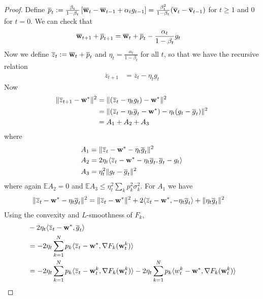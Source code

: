\begin{proof}
	Define $\overline{p}_{t}:=\frac{\beta_{t}}{1-\beta_{t}}\left[{\overline{\mathbf{w}}}_{t}-{\overline{\mathbf{w}}}_{t-1}+\alpha_{t}g_{t-1}\right]=\frac{\beta_{t}^{2}}{1-\beta_{t}}({\overline{\mathbf{v}}}_{t}-{\overline{\mathbf{v}}}_{t-1})$
	for $t\geq1$ and 0 for $t=0$. We can check that 
	\begin{align*}
	{\overline{\mathbf{w}}}_{t+1}+\overline{p}_{t+1} & ={\overline{\mathbf{w}}}_{t}+\overline{p}_{t}-\frac{\alpha_{t}}{1-\beta_{t}}g_{t}
	\end{align*}
	Now we define $\overline{z}_{t}:={\overline{\mathbf{w}}}_{t}+\overline{p}_{t}$
	and $\eta_{t}=\frac{\alpha_{t}}{1-\beta_{t}}$ for all $t$, so that
	we have the recursive relation 
	\begin{align*}
	\overline{z}_{t+1} & =\overline{z}_{t}-\eta_{t}g_{t}
	\end{align*}
	Now 
	\begin{align*}
	\|\overline{z}_{t+1}-{\mathbf{w}}^{\ast}\|^{2} & =\|(\overline{z}_{t}-\eta_{t}g_{t})-{\mathbf{w}}^{\ast}\|^{2}\\
	& =\|(\overline{z}_{t}-\eta_{t}\overline{g}_{t}-{\mathbf{w}}^{\ast})-\eta_{t}(g_{t}-\overline{g}_{t})\|^{2}\\
	& =A_{1}+A_{2}+A_{3}
	\end{align*}
	where 
	\begin{align*}
	A_{1} & =\|\overline{z}_{t}-{\mathbf{w}}^{\ast}-\eta_{t}\overline{g}_{t}\|^{2}\\
	A_{2} & =2\eta_{t}\langle\overline{z}_{t}-{\mathbf{w}}^{\ast}-\eta_{t}\overline{g}_{t},\overline{g}_{t}-g_{t}\rangle\\
	A_{3} & =\eta_{t}^{2}\|g_{t}-\overline{g}_{t}\|^{2}
	\end{align*}
	where again $\mathbb{E}A_{2}=0$ and $\mathbb{E}A_{3}\leq\eta_{t}^{2}\sum_{k}p_{k}^{2}\sigma_{k}^{2}$.
	For $A_{1}$ we have 
	\begin{align*}
	\|\overline{z}_{t}-{\mathbf{w}}^{\ast}-\eta_{t}\overline{g}_{t}\|^{2} & =\|\overline{z}_{t}-{\mathbf{w}}^{\ast}\|^{2}+2\langle\overline{z}_{t}-{\mathbf{w}}^{\ast},-\eta_{t}\overline{g}_{t}\rangle+\|\eta_{t}\overline{g}_{t}\|^{2}
	\end{align*}
	Using the convexity and $L$-smoothness of $F_{k}$, 
	\begin{align*}
	& -2\eta_{t}\langle\overline{z}_{t}-\vw^{\ast},\overline{g}_{t}\rangle\\
	& =-2\eta_{t}\sum_{k=1}^{N}p_{k}\langle\overline{z}_{t}-\vw^{\ast},\nabla F_{k}(\vw_{t}^{k})\rangle\\
	& =-2\eta_{t}\sum_{k=1}^{N}p_{k}\langle\overline{z}_{t}-\vw_{t}^{k},\nabla F_{k}(\vw_{t}^{k})\rangle-2\eta_{t}\sum_{k=1}^{N}p_{k}\langle w_{t}^{k}-\vw^{\ast},\nabla F_{k}(\vw_{t}^{k})\rangle\\

\end{align*}
\end{proof}
